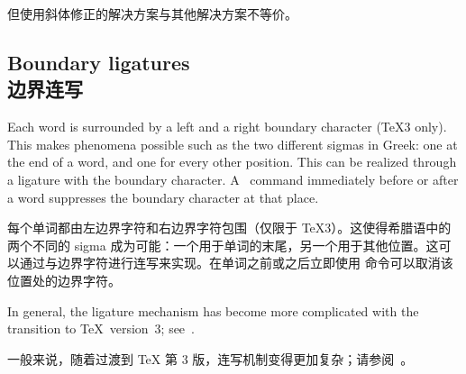 但使用斜体修正的解决方案与其他解决方案不等价。


\subsection{Boundary ligatures\\边界连写}

Each word is surrounded by a left and a right
boundary character (\TeX3 only).
This makes phenomena possible
such as the two different sigmas in Greek:
one at the end of a word, and one for every other position.
This can be realized through a ligature with the
boundary character. A~ command immediately
before or after a word suppresses the boundary character
at that place.

每个单词都由左边界字符和右边界字符包围（仅限于 \TeX3）。这使得希腊语中的两个不同的 sigma 成为可能：一个用于单词的末尾，另一个用于其他位置。这可以通过与边界字符进行连写来实现。在单词之前或之后立即使用  命令可以取消该位置处的边界字符。

In general, the ligature mechanism has become more complicated
with the transition to \TeX\ version~3; see~\cite{K:TeX23}.

一般来说，随着过渡到 \TeX{} 第 3 版，连写机制变得更加复杂；请参阅~\cite{K:TeX23}。

